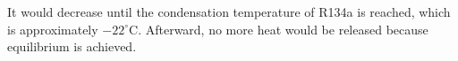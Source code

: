 It would decrease until the condensation temperature of R134a is reached, which is approximately \( -22^\circ \text{C} \). Afterward, no more heat would be released because equilibrium is achieved.